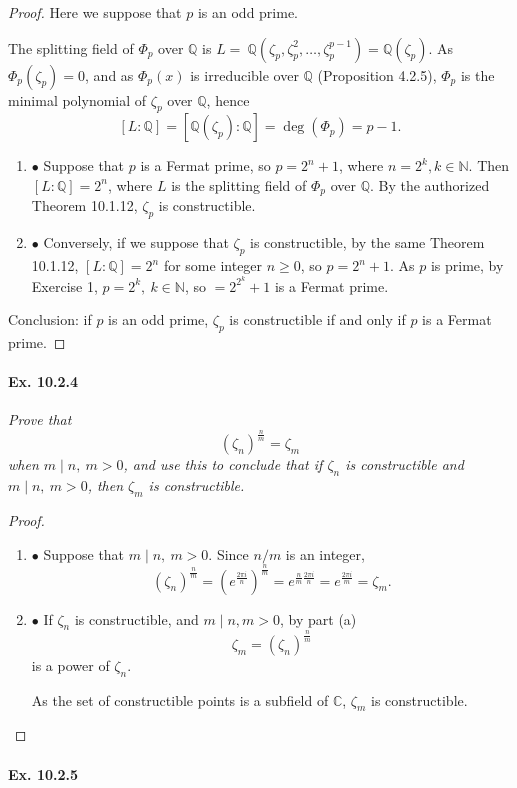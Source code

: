 \documentclass[11pt,a4paper]{article}
\newcommand{\be} {\begin{enumerate}}
\newcommand{\ee} {\end{enumerate}}
\newcommand{\Q}{\mathbb{Q}}
\newcommand{\N}{\mathbb{N}}
\newcommand{\C}{\mathbb{C}}
\begin{document}
\begin{proof} 
Here we suppose that $p$ is an odd prime.

The splitting field of $\Phi_p$ over $\Q$ is $L = \ \Q(\zeta_p,\zeta_p^2,\ldots,\zeta_p^{p-1}) =\Q(\zeta_p)$. As $\Phi_p(\zeta_p) = 0$, and as $\Phi_p(x)$ is irreducible over $\Q$ (Proposition 4.2.5), $\Phi_p$ is the minimal polynomial of $\zeta_p$ over $\Q$, hence
$$[L : \Q] = [\Q(\zeta_p) : \Q] = \deg(\Phi_p) = p-1.$$

\be
\item[$\bullet$] Suppose that $p$ is a Fermat prime, so $p=2^n +1$, where $n=2^k, k\in \N$. Then $[L:\Q] = 2^n$, where $L$ is the splitting field of $\Phi_p$ over $\Q$. By the authorized Theorem 10.1.12, $\zeta_p$ is constructible.

\item[$\bullet$]  Conversely, if we suppose that $\zeta_p$ is constructible, by the same Theorem 10.1.12, $[L:\Q] = 2^n$ for some integer $n\geq 0$, so $p=2^n+1$. As $p$ is prime, by Exercise 1, $p=2^k,\ k\in \N$, so $ = 2^{2^k}+1$ is a Fermat prime.
\ee
Conclusion: if $p$ is an odd prime, $\zeta_p$ is constructible if and only if $p$ is a Fermat prime.
\end{proof}

\paragraph{Ex. 10.2.4}

{\it Prove that $$(\zeta_n)^{\frac{n}{m}} = \zeta_m$$ when $m\mid n, \ m>0$, and use this to conclude that if $\zeta_n$ is constructible and $m\mid n,\ m>0$, then $\zeta_m$ is constructible.
}

\begin{proof} 
\be
\item[$\bullet$]  Suppose that $m \mid n,\ m>0$. Since $n/m$ is an integer,
$$(\zeta_n)^{\frac{n}{m}} = \left ( e^{\frac{2\pi i}{n}} \right )^{\frac{n}{m}} = e^{\frac{n}{m} \frac{2\pi i}{n}} = e^{\frac{2\pi i}{m}} = \zeta_m.$$
\item[$\bullet$] If $\zeta_n$ is constructible, and $m\mid n, m>0$, by part (a)
$$\zeta_m = (\zeta_n)^{\frac{n}{m}} $$
is a power of $\zeta_n$. 

As the set of constructible points is a subfield of $\C$, $\zeta_m$ is constructible.
\ee
\end{proof}

\paragraph{Ex. 10.2.5}
\end{document}
